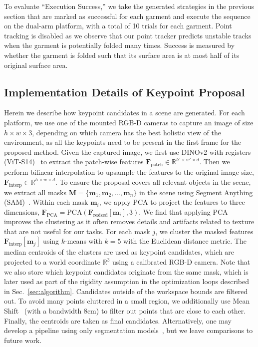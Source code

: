 To evaluate ``Execution Success,'' we take the generated strategies in the previous section that are marked as successful for each garment and execute the sequence on the dual-arm platform, with a total of 10 trials for each garment. Point tracking is disabled as we observe that our point tracker predicts unstable tracks when the garment is potentially folded many times. Success is measured by whether the garment is folded such that its surface area is at most half of its original surface area.

\subsection{Implementation Details of Keypoint Proposal}\label{app:proposal}
Herein we describe how keypoint candidates in a scene are generated.
For each platform, we use one of the mounted RGB-D cameras to capture an image of size ${h \times w \times 3}$, depending on which camera has the best holistic view of the environment, as all the keypoints need to be present in the first frame for the proposed method.
Given the captured image, we first use DINOv2 with registers (ViT-S14)~\cite{darcet2023vision,oquab2023dinov2} to extract the patch-wise features $\mathbf{F}_{\text{patch}} \in \mathbb{R}^{h' \times w' \times d}$.
Then we perform bilinear interpolation to upsample the features to the original image size, $\mathbf{F}_{\text{interp}} \in \mathbb{R}^{h \times w \times d}$.
To ensure the proposal covers all relevant objects in the scene, we extract all masks $\mathbf{M} = \{\mathbf{m}_1, \mathbf{m}_2, \ldots, \mathbf{m}_n\}$ in the scene using Segment Anything (SAM)~\cite{kirillov2023segment}.
Within each mask $\mathbf{m}_i$, we apply PCA to project the features to three dimensions, $\mathbf{F}_{\text{PCA}} = \text{PCA}(\mathbf{F}_{\text{resized}}[\mathbf{m}_i], 3)$.
We find that applying PCA improves the clustering as it often removes details and artifacts related to texture that are not useful for our tasks. 
For each mask $j$, we cluster the masked features $\mathbf{F}_{\text{interp}}[\mathbf{m}_j]$ using $k$-means with $k=5$ with the Euclidean distance metric.
The median centroids of the clusters are used as keypoint candidates, which are projected to a world coordinate $\mathbb{R}^3$ using a calibrated RGB-D camera.
Note that we also store which keypoint candidates originate from the same mask, which is later used as part of the rigidity assumption in the optimization loops described in Sec.~\ref{sec:algorithm}.
Candidates outside of the workspace bounds are filtered out.
To avoid many points cluttered in a small region, we additionally use Mean Shift~\cite{comaniciu2002mean,scikit-learn} (with a bandwidth $8$cm) to filter out points that are close to each other.
Finally, the centroids are taken as final candidates.
Alternatively, one may develop a pipeline using only segmentation models~\cite{kirillov2023segment,yang2023set}, but we leave comparisons to future work.

